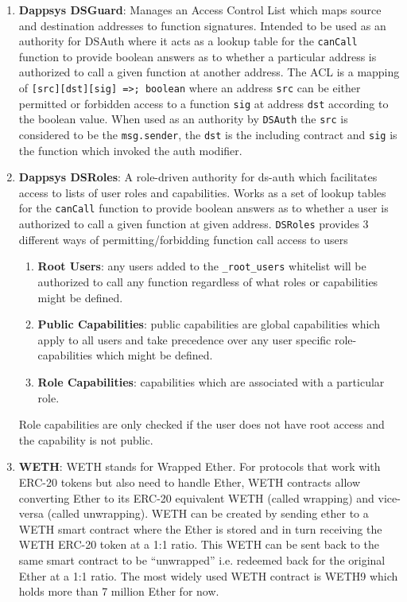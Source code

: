 \begin{enumerate}
\item\textbf{Dappsys DSGuard}: Manages an Access Control List which maps source and destination addresses to function signatures. Intended to be used as an authority for DSAuth where it acts as a lookup table for the \verb|canCall| function to provide boolean answers as to whether a particular address is authorized to call a given function at another address. The ACL is a mapping of \verb|[src][dst][sig] =>; boolean| where an address \verb|src| can be either permitted or forbidden access to a function \verb|sig| at address \verb|dst| according to the boolean value. When used as an authority by \verb|DSAuth| the \verb|src| is considered to be the \verb|msg.sender|, the \verb|dst| is the including contract and \verb|sig| is the function which invoked the auth modifier.

\item\textbf{Dappsys DSRoles}: A role-driven authority for ds-auth which facilitates access to lists of user roles and capabilities. Works as a set of lookup tables for the \verb|canCall| function to provide boolean answers as to whether a user is authorized to call a given function at given address. \verb|DSRoles| provides 3 different ways of permitting/forbidding function call access to users
    \begin{enumerate}
    \item\textbf{Root Users}: any users added to the \verb|_root_users| whitelist will be authorized to call any function regardless of what roles or capabilities might be defined.
    \item\textbf{Public Capabilities}: public capabilities are global capabilities which apply to all users and take precedence over any user specific role-capabilities which might be defined.
    \item\textbf{Role Capabilities}: capabilities which are associated with a particular role.
    \end{enumerate}
    Role capabilities are only checked if the user does not have root access and the capability is not public.

\item\textbf{WETH}: WETH stands for Wrapped Ether. For protocols that work with ERC-20 tokens but also need to handle Ether, WETH contracts allow converting Ether to its ERC-20 equivalent WETH (called wrapping) and vice-versa (called unwrapping). WETH can be created by sending ether to a WETH smart contract where the Ether is stored and in turn receiving the WETH ERC-20 token at a 1:1 ratio. This WETH can be sent back to the same smart contract to be “unwrapped” i.e. redeemed back for the original Ether at a 1:1 ratio. The most widely used WETH contract is WETH9 which holds more than 7 million Ether for now.


\end{enumerate}
